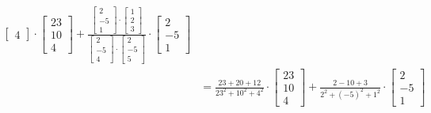 \documentclass[11pt, a4paper, norsk]{NTNUoving}
\begin{document}
\begin{oppgave}
\begin{punkt}
\begin{align*}
{\begin{bmatrix}
                   4
               \end{bmatrix}} \cdot \begin{bmatrix}
                   23 \\
                   10 \\
                   4
               \end{bmatrix} + \frac{\begin{bmatrix}
                   2 \\
                   -5 \\
                   1
               \end{bmatrix} \cdot \begin{bmatrix}
                   1 \\
                   2 \\
                   3
               \end{bmatrix}}{\begin{bmatrix}
                   2 \\
                   -5 \\
                   4
               \end{bmatrix} \cdot \begin{bmatrix}
                   2 \\
                   -5 \\
                   5
               \end{bmatrix}} \cdot \begin{bmatrix}
                   2 \\
                   -5 \\
                   1
               \end{bmatrix}
               \\
                     &= \frac{23 + 20 + 12}{23^2 + 10^2 + 4^2} \cdot \begin{bmatrix}
                         23 \\
                         10 \\
                         4
                     \end{bmatrix} + \frac{2 - 10 + 3}{2^2 + (-5)^2 + 1^2} \cdot \begin{bmatrix}
                         2 \\
                         -5 \\
                         1
                     \end{bmatrix}
                     \\

\end{align*}
\end{punkt}
\end{oppgave}
\end{document}
